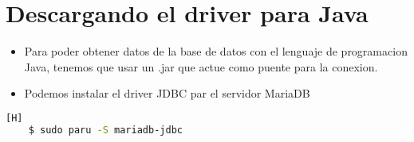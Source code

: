 \section{Descargando el driver para Java}
\begin{itemize}
  \item Para poder obtener datos de la base de datos con el lenguaje de programacion Java, tenemos que usar un .jar que actue como puente para la conexion.
  \item Podemos instalar el driver JDBC par el servidor MariaDB
\end{itemize}

\begin{lstlisting}[language=bash,caption={Descargando el servidor y el cliente MariaDB}][H]
	$ sudo paru -S mariadb-jdbc
\end{lstlisting}

